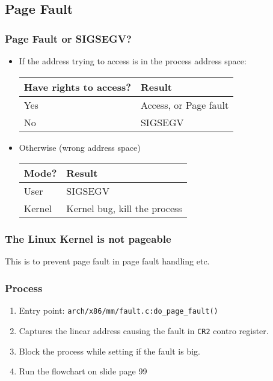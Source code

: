 \documentclass[11pt]{article}
\begin{document}
\subsection{Page Fault}
\label{sec:org00b58bc}
\subsubsection{Page Fault or SIGSEGV?}
\label{sec:orgf64b912}
\begin{itemize}
\item If the address trying to access is in the process address space:
\begin{center}
\begin{tabular}{ll}
Have rights to access? & Result\\
\hline
Yes & Access, or Page fault\\
No & SIGSEGV\\
\end{tabular}
\end{center}
\item Otherwise (wrong address space)
\begin{center}
\begin{tabular}{ll}
Mode? & Result\\
\hline
User & SIGSEGV\\
Kernel & Kernel bug, kill the process\\
\end{tabular}
\end{center}
\end{itemize}
\subsubsection{The Linux Kernel is not pageable}
\label{sec:org44deeb9}
This is to prevent page fault in page fault handling etc.
\subsubsection{Process}
\label{sec:org5edb051}
\begin{enumerate}
\item Entry point: \texttt{arch/x86/mm/fault.c:do\_page\_fault()}
\item Captures the linear address causing the fault in \texttt{CR2} contro register.
\item Block the process while setting if the fault is big.
\item Run the flowchart on slide page 99
\end{enumerate}
\end{document}
